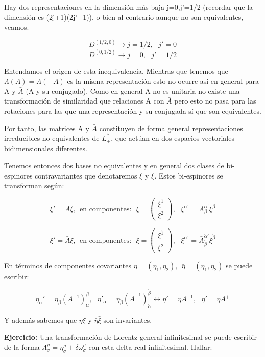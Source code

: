 \documentclass{article}
\begin{document}
Hay dos representaciones en la dimensión más baja j=0,j'=1/2 (recordar que la dimensión es (2j+1)(2j'+1)), o bien al contrario aunque no son equivalentes, veamos.

$$D^{(1/2,0)} \longrightarrow j=1/2, \ \ \ j'=0$$
$$D^{(0, 1/2)} \longrightarrow j=0, \ \ \ j'=1/2$$

Entendamos el origen de esta inequivalencia. Mientras que tenemos que $\Lambda (A)=\Lambda (-A)$ es la misma representación esto no ocurre así en general para A y $\bar{A}$ (A y su conjugado). Como en general A no es unitaria no existe una transformación de similaridad que relaciones A con $\bar{A}$ pero esto no pasa para las rotaciones para las que una representación y su conjugada sí que son equivalentes.

\smallskip
Por tanto, las matrices A y $\bar{A}$ constituyen de forma general representaciones irreducibles no equivalentes de $L^\uparrow _+$, que actúan en dos espacios vectoriales bidimensionales diferentes.

Tenemos entonces dos bases no equivalentes y en general dos clases de bi-espinores contravariantes que denotaremos $\xi$ y $\bar{\xi}$. Estos bi-espinores se transforman según:

$$\xi '=A\xi, \ \ \text{en componentes:} \ \ \ \xi =\left ( \begin{array}{c}
  \xi ^1  \\
 \xi ^2
\end{array}\right), \ \ \ \xi ^{\alpha '}=A ^{\alpha '}_\beta \xi ^\beta$$

$$\xi '=\bar{A}\xi, \ \ \text{en componentes:} \ \ \ \xi =\left ( \begin{array}{c}
  \xi ^\dot{1}  \\
 \xi ^\dot{2}
\end{array}\right), \ \ \ \xi ^{\dot{\alpha} '}=\bar{A} ^{\dot{\alpha} '}_{\dot{\beta}} \xi ^\dot{\beta}$$

En términos de componentes covariantes $\eta =(\eta _1 , \eta _2), \ \ \bar{\eta}=(\eta _{\dot{1}},\eta _{\dot{2}})$ se puede escribir:

$$\eta _{\alpha }' = \eta _{\beta} (A^{-1})^\beta _\alpha , \ \ \ \eta '_{\dot{\alpha}}=\eta _{\dot{ \beta}}(\bar{A}^{-1})^{\dot{\beta}}_{\dot{ \alpha}} \leftrightarrow \eta '=\eta A^{-1}, \ \ \ \bar{\eta}'=\bar{\eta}A^+$$

Y además sabemos que $\eta \xi$ y $ \bar{\eta}\bar{\xi}$ son invariantes.

\smallskip
\textbf{Ejercicio:} Una transformación de Lorentz general infinitesimal se puede escribir de la forma $\Lambda _\sigma ^\rho = \eta ^\rho _\sigma + \delta \omega ^\rho _\sigma$ con esta delta real infinitesimal. Hallar:
\end{document}
